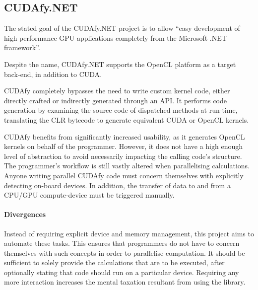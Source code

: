 \subsection{CUDAfy.NET}
The stated goal of the CUDAfy.NET\cite{cudafy} project is to allow ``easy development of high performance \ac{GPU} applications completely from the Microsoft .NET framework''.

Despite the name, CUDAfy.NET supports the \ac{OpenCL} platform as a target back-end, in addition to \ac{CUDA}.

CUDAfy completely bypasses the need to write custom kernel code, either directly crafted or indirectly generated through an API. It performs code generation by examining the source code of dispatched methods at run-time, translating the \ac{CLR} bytecode to generate equivalent \ac{CUDA} or \ac{OpenCL} kernels.

CUDAfy benefits from significantly increased usability, as it generates \ac{OpenCL} kernels on behalf of the programmer. However, it does not have a high enough level of abstraction to avoid necessarily impacting the calling code's structure. The programmer's workflow is still vastly altered when parallelising calculations. Anyone writing parallel CUDAfy code must concern themselves with explicitly detecting on-board devices. In addition, the transfer of data to and from a \ac{CPU}/\ac{GPU} compute-device must be triggered manually.

\paragraph*{Divergences}
Instead of requiring explicit device and memory management, this project aims to automate these tasks. This ensures that programmers do not have to concern themselves with such concepts in order to parallelise computation. It should be sufficient to solely provide the calculations that are to be executed, after optionally stating that code should run on a particular device. Requiring any more interaction increases the mental taxation resultant from using the library.

